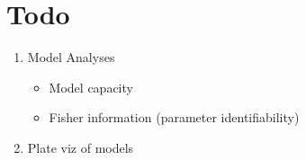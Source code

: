 \documentclass[english]{scrartcl}
\begin{document}
\section{Todo}

\begin{enumerate}
	\item Model Analyses
	\begin{itemize}
		\item Model capacity
		\item Fisher information (parameter identifiability)
	\end{itemize}
	\item Plate viz of models
\end{enumerate}


% 
\end{document}
